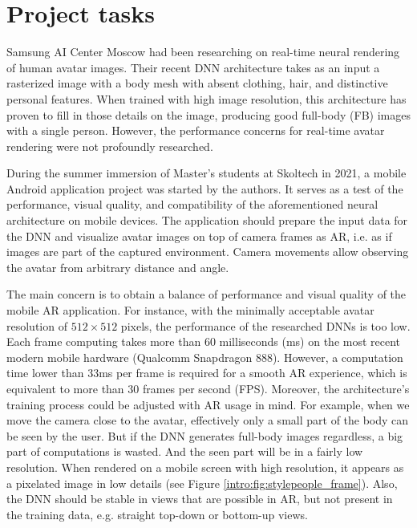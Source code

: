 \section{Project tasks}\label{intro:task}
 
Samsung AI Center Moscow had been researching on real-time neural rendering of human avatar images. Their recent DNN architecture \cite{dnn:stylepeople21} takes as an input a rasterized image with a body mesh with absent clothing, hair, and distinctive personal features. When trained with high image resolution, this architecture has proven to fill in those details on the image, producing good full-body (FB) images with a single person. However, the performance concerns for real-time avatar rendering were not profoundly researched.
 

During the summer immersion of Master's students at Skoltech in 2021, a mobile Android application project was started by the authors. It serves as a test of the performance, visual quality, and compatibility of the aforementioned neural architecture on mobile devices. The application should prepare the input data for the DNN and visualize avatar images on top of camera frames as AR, i.e. as if images are part of the captured environment. Camera movements allow observing the avatar from arbitrary distance and angle.
 
The main concern is to obtain a balance of performance and visual quality of the mobile AR application. For instance, with the minimally acceptable avatar resolution of $512\times512$ pixels, the performance of the researched DNNs is too low. Each frame computing takes more than 60 milliseconds (ms) on the most recent modern mobile hardware (Qualcomm Snapdragon 888). However, a computation time lower than 33ms per frame is required for a smooth AR experience, which is equivalent to more than 30 frames per second (FPS). Moreover, the architecture's training process could be adjusted with AR usage in mind. For example, when we move the camera close to the avatar, effectively only a small part of the body can be seen by the user. But if the DNN generates full-body images regardless, a big part of computations is wasted. And the seen part will be in a fairly low resolution. When rendered on a mobile screen with high resolution, it appears as a pixelated image in low details (see Figure \ref{intro:fig:stylepeople_frame}\protect{}). Also, the DNN should be stable in views that are possible in AR, but not present in the training data, e.g. straight top-down or bottom-up views. 

